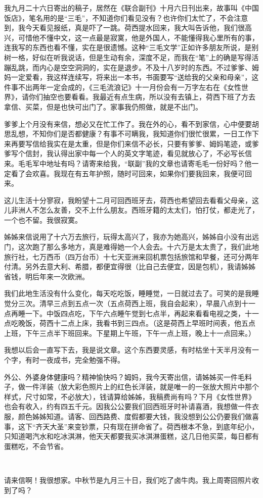 \par {}
\par 我九月二十六日寄出的稿子，居然在《联合副刊》十月六日刊出来，故事叫《中国饭店》，笔名用的是“三毛”，不知道你们看见没有？也许你们太忙了，不会注意到，我今天看见报纸，真是吓了一跳。荷西提水回来，我大叫告诉他，我们很高兴，可惜他不懂中文，这一点最是寂寞，他是外国人，不能懂得我心里所有的事，连我写的东西也看不懂，实在是很遗憾。这种“三毛文学”正如许多朋友所说，是别树一格，好似在听我说话，但是生动有余，深度不足，而我在“笔”上的确是写得活蹦乱跳，而内心是空空洞洞的，实在是退步。不及十八岁时的东西。不过爹爹、姆妈一定爱看，我这样连续写，将来出一本书，书面要写“送给我的父亲和母亲”，这件事不出两年一定会成的，《三毛流浪记》十一月份会有一万字左右在《女性世界》，请你们抽空也要看看。我最近有点生病，所以没有去镇上，荷西下班了方去拿信、买菜，但是也快可出门了。家事我仍照做，就是不出门。
\par 爹爹上个月没有来信，想必又在忙工作了。我在外的心，看不到家信，心中便要胡思乱想，不知你们是否都健康？有事不可瞒我，我知道你们很忙很累，一日工作下来再要写信给我实在是太重，但是你们来信不必长，只要有爹爹、姆妈笔迹，或爹爹写个信封，我认得出家中每一个人的英文字笔迹，看见就放心了，不必写长信来。毛毛军中地址有吗？请寄来给我，“联副”我的文章也请寄毛毛一份好吗？他一定看了会欢喜。我现在有五年护照，随时可回来，如果你们要我回来，我便可回来。
\par 这儿生活十分寥寂，我盼望十二月可回西班牙去，荷西也希望回去看看父母亲，这儿非洲人不怎么友善，交不上什么朋友。西班牙籍的太太们，怕打仗，都走光了，一个也不留。我很寂寞。
\par 姊姊来信说用了十六万去旅行，玩得太高兴了，我亦为她高兴，姊姊自小没有出远门，这次跑了那么多地方，真是难得她一个人会去。十六万是太太贵了，我们此地旅行社，七万西币（四万台币）十七天亚洲来回机票包括旅馆和早餐，还可分两年付清。另外去意大利、希腊，都便宜得很（比自己去便宜，因是包机），我请姊姊省钱，明后年来一次欧洲。
\par 我们此地生活没有什么变化，每天吃吃饭，睡睡觉，一日就过去了。可笑的是我睡觉分三次。清早三点到五点一次（五点荷西上班，我自会起来），早晨八点到十一点再睡一下。中饭四点吃，下午六点睡午觉到七点半，再起来看看电视之类，十一点吃晚饭，荷西十二点上床，我看书到三四点。（这是荷西上早班时间表，他五点上班，下午三点半下班回来。下星期上午班，下午一点上班，晚上十一点回来。）
\par 我想以后会一直写下去，我是说文章。这个东西要灵感，有时枯坐十天半月没有一个字，有时一夜成书，完全勉强不得。
\par 外公、外婆身体健康吗？精神愉快吗？姆妈，我今天寄出信，请姊姊买一件毛料子，做一件洋装（放大彩色照片上的红色长洋装，就是唯一的一张放大照片中那个样式，尺寸如常，不必放大），钱请算给姊姊，我稿费尚有吗？下月《女性世界》也会有收入，约有四五千元。因我公公要我们回西班牙时补请喜酒，我想做一件衣服，颜色姊姊知道。请客、回西路费、度假都要大钱，我没想到公公仍要我们做喜事，这下“齐天大圣”来变钞票，只有现在拼命省了。荷西根本不急，到底年纪小，只知道喝汽水和吃冰淇淋，他天天都要我买冰淇淋蛋糕，这几日他买菜，每日都有蛋糕吃，不会节省。
\par  
\par 请来信啊！我很想家。中秋节是九月三十日，我们吃了卤牛肉。我上周寄回照片收到了吗？
\par {}

